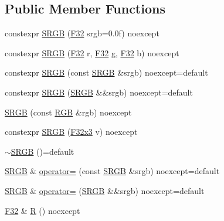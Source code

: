 \subsection*{Public Member Functions}
\begin{DoxyCompactItemize}
\item 
constexpr \mbox{\hyperlink{structmage_1_1_s_r_g_b_a5f1cc4d90aaa3801f1146eb767d45476}{S\+R\+GB}} (\mbox{\hyperlink{namespacemage_aa97e833b45f06d60a0a9c4fc22ae02c0}{F32}} srgb=0.\+0f) noexcept
\item 
constexpr \mbox{\hyperlink{structmage_1_1_s_r_g_b_acf4eb424d13f8ee60065c3d7e118987b}{S\+R\+GB}} (\mbox{\hyperlink{namespacemage_aa97e833b45f06d60a0a9c4fc22ae02c0}{F32}} r, \mbox{\hyperlink{namespacemage_aa97e833b45f06d60a0a9c4fc22ae02c0}{F32}} g, \mbox{\hyperlink{namespacemage_aa97e833b45f06d60a0a9c4fc22ae02c0}{F32}} b) noexcept
\item 
constexpr \mbox{\hyperlink{structmage_1_1_s_r_g_b_a3b895db44e4e6cc72249fadc093cf084}{S\+R\+GB}} (const \mbox{\hyperlink{structmage_1_1_s_r_g_b}{S\+R\+GB}} \&srgb) noexcept=default
\item 
constexpr \mbox{\hyperlink{structmage_1_1_s_r_g_b_aca835f4281827524ad14345ddb28208a}{S\+R\+GB}} (\mbox{\hyperlink{structmage_1_1_s_r_g_b}{S\+R\+GB}} \&\&srgb) noexcept=default
\item 
\mbox{\hyperlink{structmage_1_1_s_r_g_b_a4b56eeabfaee47d0f0685a061947ce59}{S\+R\+GB}} (const \mbox{\hyperlink{structmage_1_1_r_g_b}{R\+GB}} \&rgb) noexcept
\item 
constexpr \mbox{\hyperlink{structmage_1_1_s_r_g_b_abb02103839b539049a6dd54dd7936b16}{S\+R\+GB}} (\mbox{\hyperlink{namespacemage_a1e3c7a882af461f161caa1cbddaf1fa2}{F32x3}} v) noexcept
\item 
\mbox{\hyperlink{structmage_1_1_s_r_g_b_aa5bb0738c6026da6c3e4f54869c52cbc}{$\sim$\+S\+R\+GB}} ()=default
\item 
\mbox{\hyperlink{structmage_1_1_s_r_g_b}{S\+R\+GB}} \& \mbox{\hyperlink{structmage_1_1_s_r_g_b_a08c0aaef872868f2415b5d58c5611764}{operator=}} (const \mbox{\hyperlink{structmage_1_1_s_r_g_b}{S\+R\+GB}} \&srgb) noexcept=default
\item 
\mbox{\hyperlink{structmage_1_1_s_r_g_b}{S\+R\+GB}} \& \mbox{\hyperlink{structmage_1_1_s_r_g_b_a73ee0aadb04bbf07976b1e2daded2aff}{operator=}} (\mbox{\hyperlink{structmage_1_1_s_r_g_b}{S\+R\+GB}} \&\&srgb) noexcept=default
\item 
\mbox{\hyperlink{namespacemage_aa97e833b45f06d60a0a9c4fc22ae02c0}{F32}} \& \mbox{\hyperlink{structmage_1_1_s_r_g_b_a31af84b210d04e9313a8e4a9fc4670db}{R}} () noexcept

\end{DoxyCompactItemize}
